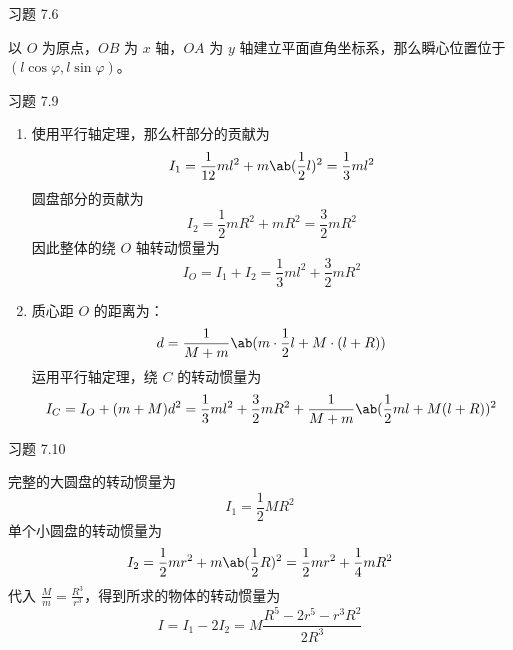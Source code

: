 \begin{problem}
    习题 7.6
    \begin{solution}
        以 $O$ 为原点，$OB$ 为 $x$ 轴，$OA$ 为 $y$ 轴建立平面直角坐标系，那么瞬心位置位于 $(l \cos \varphi, l \sin \varphi)$。
    \end{solution}
\end{problem}

\begin{problem}
    习题 7.9
    \begin{solution}
        \begin{enumerate}
            \item[\textbf{1)}] 使用平行轴定理，那么杆部分的贡献为
            $$
            I_1 = \frac{1}{12} m l^2 + m \ab(\frac{1}{2} l)^2 = \frac{1}{3} m l^2
            $$
            圆盘部分的贡献为
            $$
            I_2 = \frac{1}{2} m R^2 + m R^2 = \frac{3}{2} m R^2
            $$
            因此整体的绕 $O$ 轴转动惯量为
            $$
            I_O = I_1 + I_2 = \frac{1}{3} m l^2 + \frac{3}{2} m R^2
            $$
            \item[\textbf{2)}] 质心距 $O$ 的距离为：
            $$
            d = \frac{1}{M + m} \ab(m \cdot \frac{1}{2} l + M \cdot (l + R))
            $$
            运用平行轴定理，绕 $C$ 的转动惯量为
            $$
            I_C = I_O + (m + M) d^2 = \frac{1}{3} m l^2 + \frac{3}{2} m R^2 + \frac{1}{M + m} \ab(\frac{1}{2} m l + M (l + R))^2
            $$
        \end{enumerate}
    \end{solution}
\end{problem}

\begin{problem}
    习题 7.10
    \begin{solution}
        完整的大圆盘的转动惯量为
        $$
        I_1 = \frac{1}{2} M R^2
        $$
        单个小圆盘的转动惯量为
        $$
        I_2 = \frac{1}{2} m r^2 + m \ab(\frac{1}{2} R)^2 = \frac{1}{2} m r^2 + \frac{1}{4} m R^2
        $$
        代入 $\frac{M}{m} = \frac{R^3}{r^3}$，得到所求的物体的转动惯量为
        $$
        I = I_1 - 2 I_2 = M \frac{R^5 - 2r^5 - r^3 R^2}{2 R^3}
        $$
    \end{solution}
\end{problem}